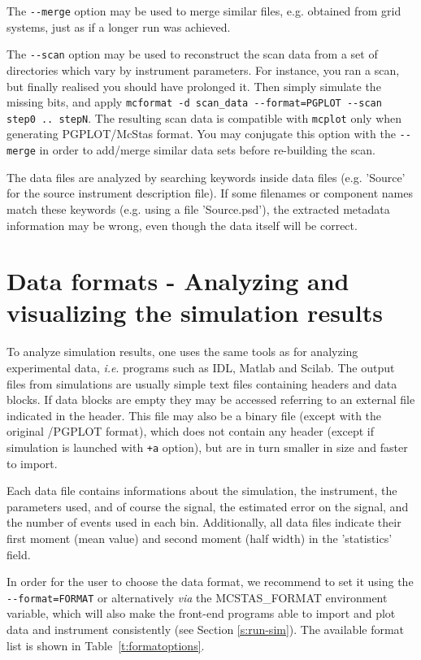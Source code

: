 The \verb+--merge+ option may be used to merge similar files, e.g. obtained from
grid systems, just as if a longer run was achieved.

The \verb+--scan+ option may be used to reconstruct the scan data from a set of
directories which vary by instrument parameters. For instance, you ran a scan,
but finally realised you should have prolonged it. Then simply simulate the
missing bits, and apply
\verb+mcformat -d scan_data --format=PGPLOT --scan step0 .. stepN+. The
resulting scan data is compatible with \verb+mcplot+ only when generating
PGPLOT/McStas format. You may conjugate this option with the
\verb+--merge+ in order to add/merge similar data sets before re-building the
scan.

The data files are analyzed by searching keywords inside data files
(e.g. 'Source' for the source instrument description file). If some filenames or
component names match these keywords (e.g. using a file 'Source.psd'), the
extracted metadata information may be wrong, even though the data itself will be
correct.

\section{Data formats - Analyzing and visualizing the simulation results}
\label{s:analyze}

To analyze simulation results, one uses the same tools as for analyzing
experimental data, \textit{i.e}. programs such as IDL, Matlab and Scilab.  The
output files from simulations are usually simple text files containing headers
and data blocks. If data blocks are empty they may be accessed referring to an
external file indicated in the header. This file may also be a binary file
(except with the original \MCS /PGPLOT format), which does not contain any
header (except if simulation is launched with \verb|+a| option), but are in turn
smaller in size and faster to import.

Each data file contains informations about the simulation, the instrument, the
parameters used, and of course the signal, the estimated error on the signal,
and the number of events used in each bin. Additionally, all data files indicate
their first moment (mean value) and second moment (half width) in the
'statistics' field.

In order for the user to choose the data format, we recommend to set it using
the \verb+--format=FORMAT+ or alternatively {\it via} the MCSTAS\_FORMAT
environment variable, which will also make the front-end programs able to import
and plot data and instrument consistently (see Section \ref{s:run-sim}). The
available format list is shown in
Table~\ref{t:formatoptions}. 

